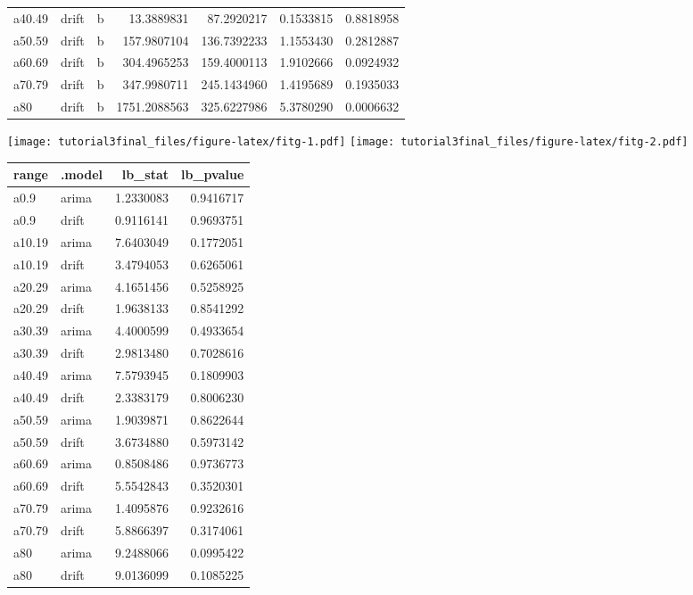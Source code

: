 \documentclass[
]{article}
\begin{document}
\begin{table}[!h]
\begin{tabular}[t]{lllrrrr}
a40.49 & drift & b & 13.3889831 & 87.2920217 & 0.1533815 & 0.8818958\\
a50.59 & drift & b & 157.9807104 & 136.7392233 & 1.1553430 & 0.2812887\\
a60.69 & drift & b & 304.4965253 & 159.4000113 & 1.9102666 & 0.0924932\\
\addlinespace
a70.79 & drift & b & 347.9980711 & 245.1434960 & 1.4195689 & 0.1935033\\
a80 & drift & b & 1751.2088563 & 325.6227986 & 5.3780290 & 0.0006632\\
\bottomrule
\end{tabular}
\end{table}

\texttt{[image: tutorial3final\_files/figure-latex/fitg-1.pdf]} \texttt{[image: tutorial3final\_files/figure-latex/fitg-2.pdf]}

\begin{tabular}{l|l|r|r}
\hline
range & .model & lb\_stat & lb\_pvalue\\
\hline
a0.9 & arima & 1.2330083 & 0.9416717\\
\hline
a0.9 & drift & 0.9116141 & 0.9693751\\
\hline
a10.19 & arima & 7.6403049 & 0.1772051\\
\hline
a10.19 & drift & 3.4794053 & 0.6265061\\
\hline
a20.29 & arima & 4.1651456 & 0.5258925\\
\hline
a20.29 & drift & 1.9638133 & 0.8541292\\
\hline
a30.39 & arima & 4.4000599 & 0.4933654\\
\hline
a30.39 & drift & 2.9813480 & 0.7028616\\
\hline
a40.49 & arima & 7.5793945 & 0.1809903\\
\hline
a40.49 & drift & 2.3383179 & 0.8006230\\
\hline
a50.59 & arima & 1.9039871 & 0.8622644\\
\hline
a50.59 & drift & 3.6734880 & 0.5973142\\
\hline
a60.69 & arima & 0.8508486 & 0.9736773\\
\hline
a60.69 & drift & 5.5542843 & 0.3520301\\
\hline
a70.79 & arima & 1.4095876 & 0.9232616\\
\hline
a70.79 & drift & 5.8866397 & 0.3174061\\
\hline
a80 & arima & 9.2488066 & 0.0995422\\
\hline
a80 & drift & 9.0136099 & 0.1085225\\
\hline
\end{tabular}
\end{document}
